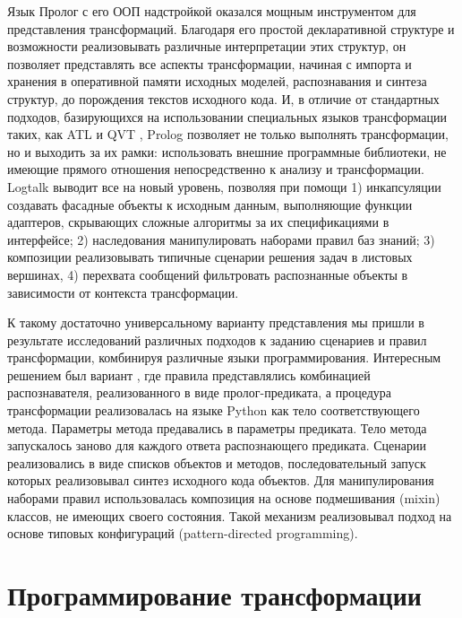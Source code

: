 \documentclass[12pt]{article}
\begin{document}
Язык Пролог с его ООП надстройкой оказался мощным инструментом для представления трансформаций.  Благодаря его простой декларативной структуре и возможности реализовывать различные интерпретации этих структур, он позволяет представлять все аспекты трансформации, начиная с импорта и хранения в оперативной памяти исходных моделей, распознавания и синтеза структур, до порождения текстов исходного кода.  И, в отличие от стандартных подходов, базирующихся на использовании специальных языков трансформации таких, как ATL и QVT \cite{QVT}, Prolog позволяет не только выполнять трансформации, но и выходить за их рамки: использовать внешние программные библиотеки, не имеющие прямого отношения непосредственно к анализу и трансформации.  Logtalk выводит все на новый уровень, позволяя при помощи 1) инкапсуляции создавать фасадные объекты к исходным данным, выполняющие функции адаптеров, скрывающих сложные алгоритмы за их спецификациями в интерфейсе; 2) наследования манипулировать наборами правил баз знаний; 3) композиции реализовывать типичные сценарии решения задач в листовых вершинах, 4) перехвата сообщений фильтровать распознанные объекты в зависимости от контекста трансформации.

К такому достаточно универсальному варианту представления мы пришли в результате исследований различных подходов к заданию сценариев и правил трансформации, комбинируя различные языки программирования.  Интересным решением был вариант \cite{b2}, где правила представлялись комбинацией распознавателя, реализованного в виде пролог-предиката, а процедура трансформации реализовалась на языке Python как тело соответствующего метода.  Параметры метода предавались в параметры предиката.  Тело метода запускалось заново для каждого ответа распознающего предиката.  Сценарии реализовались в виде списков объектов и методов, последовательный запуск которых реализовывал синтез исходного кода объектов.  Для манипулирования наборами правил использовалась композиция на основе подмешивания (mixin) классов, не имеющих своего состояния.  Такой механизм реализовывал подход на основе типовых конфигураций (pattern-directed programming).

\section{Программирование трансформации}
\end{document}
